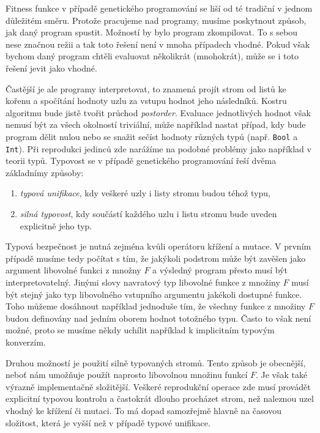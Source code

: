 Fitness funkce v případě genetického programování se liší od té tradiční v jednom
důležitém směru. Protože pracujeme nad programy, musíme poskytnout způsob, jak daný
program spustit. Možností by bylo program zkompilovat. To s sebou nese značnou režii
a tak toto řešení není v mnoha případech vhodné. Pokud však bychom daný program chtěli
evaluovat několikrát (mnohokrát), může se i toto řešení jevit jako vhodné.

Častější je ale programy interpretovat, to znamená projít strom od listů ke kořenu a 
spočítání hodnoty uzlu za vstupu hodnot jeho následníků. Kostru algoritmu bude jistě
tvořit průchod \textit{postorder}. Evaluace jednotlivých hodnot však nemusí být za všech 
okolností triviální, může například nastat případ, kdy bude program dělit nulou nebo
se snažit sečíst hodnoty různých typů (např. \texttt{Bool} a \texttt{Int}). Při reprodukci
jedinců zde narážíme na podobné problémy jako například v teorii typů. Typovost se v
případě genetického programování řeší dvěma základnímy způsoby:

\begin{enumerate}
	\item \textit{typová unifikace}, kdy veškeré uzly i listy stromu budou téhož typu,
	\item \textit{silná typovost}, kdy součástí každého uzlu i listu stromu bude uveden
	explicitně jeho typ.
\end{enumerate}

Typová bezpečnost je nutná zejména kvůli operátoru křížení a mutace. V prvním případě
musíme tedy počítat s tím, že jakýkoli podstrom může být zavěšen jako argument
libovolné funkci z množny $F$ a výsledný program přesto musí být interpretovatelný.
Jinými slovy navratový typ libovolné funkce z množiny $F$ musí být stejný jako
typ libovolného vstupního argumentu jakékoli dostupné funkce. Toho můžeme dosáhnout
například jednoduše tím, že všechny funkce z množiny $F$ budou definovány nad jedním
oborem hodnot totožného typu. Často to však není možné, proto se musíme někdy uchílit
například k implicitním typovým konverzím.

Druhou možností je použití silně typovaných stromů. Tento způsob je obecnější, neboť
nám umožňuje použít naprosto libovolnou množinu funkcí $F$. Je však také výrazně
implementačně složitější. Veškeré reprodukční operace zde musí provádět explicitní
typovou kontrolu a častokrát dlouho procházet strom, než naleznou uzel vhodný ke 
křížení či mutaci. To má dopad samozřejmě hlavně na časovou složitost, která je 
vyšší než v případě typové unifikace.

